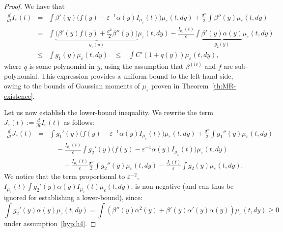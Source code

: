 \documentclass[onefignum,onetabnum]{siamart190516}
\newcommand{\1}{\mathbbm{1}}
\newcommand{\eps}{\varepsilon}
\begin{document}
\begin{proof}
We have that
\begin{eqnarray}
\nonumber
\frac{d}{dt}I_\eps(t) 
\nonumber
&=& \int \beta'(y)\Big(f(y)-\eps^{-1}\alpha(y)I_{\mu_\eps}(t)\Big)\mu_\eps(t,dy)+\frac{\sigma^2}{2}\int\beta''(y)\mu_\eps(t,dy)
\\
&=& \int \underbrace{\Big(\beta'(y)f(y)+\frac{\sigma^2}{2}\beta''(y)\Big)}_{g_1(y)}\mu_\eps(t,dy)-\frac{I_{\mu_\eps}(t)}{\eps}\int\underbrace{\beta'(y)\alpha(y)}_{g_2(y)}\mu_\eps(t,dy)
\label{eq:ineq_aux}\\
&\leq &\int g_1(y)\mu_\eps(t,dy)\;\;\;\leq\;\;\; \int C'(1+q(y))\mu_\eps(t,dy),\nonumber
\end{eqnarray}
 where $q$ is some polynomial in $y$, using the assumption that $\beta^{(iv)}$ and $f$ are sub-polynomial. This expression provides a uniform bound to the left-hand side, owing to the bounds of Gaussian moments of $\mu_\eps$ proven in Theorem~\ref{th:MR-existence}.

Let us now establish the lower-bound inequality. We rewrite the term $J_\eps(t):=\frac{d}{dt}I_\eps(t)$ as follows:
\begin{eqnarray*}
\frac{d}{dt}J_\eps(t)
&=& \int g_1'(y)\Big(f(y)-\eps^{-1}\alpha(y)I_{\mu_\eps}(t)\Big)\mu_\eps(t,dy)+\frac{\sigma^2}{2}\int g_1''(y)\mu_\eps(t,dy)
\\
&&\quad-\frac{I_{\mu_\eps}(t)}{\eps}\int g_2'(y)\Big(f(y)-\eps^{-1}\alpha(y)I_{\mu_\eps}(t)\Big)\mu_\eps(t,dy)
\\
&&\quad\quad -\frac{I_{\mu_\eps}(t)}{\eps}\frac{\sigma^2}{2}\int g_2''(y)\mu_\eps(t,dy)
-\frac{J_\eps(t)}{\eps}\int g_2(y)\mu_\eps(t,dy). 
\end{eqnarray*}
We notice that the term proportional to $\eps^{-2}$, $I_{\mu_\eps}(t)\int g_2'(y)\alpha(y)I_{\mu_\eps}(t)\mu_\eps(t,dy)$, is non-negative (and can thus be ignored for establishing a lower-bound), since:
$$
\int g_2'(y)\alpha(y)\mu_\eps(t,dy) =  \int\left(\beta''(y)\alpha^2(y)+\beta'(y)\alpha'(y)\alpha(y)\right)\mu_\eps(t,dy)\geq0
$$
under assumption~\eqref{hyp:h4}. 


\end{proof}
\end{document}

